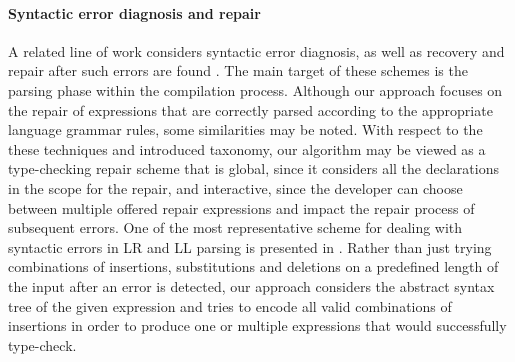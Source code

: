 \paragraph{{\bf Syntactic error diagnosis and repair}}
A related line of work considers syntactic error diagnosis, as well as recovery and repair
after such errors are found \cite{Hammond198451,Degano:1998:LTH:2245729.2245835}.
The main target of these schemes is the parsing phase within the compilation process. 
Although our approach focuses on the repair of expressions that are correctly parsed
according to the appropriate language grammar rules, some similarities may be noted.
With respect to the these techniques and introduced taxonomy, our algorithm may be viewed
as a type-checking repair scheme that is global, since it considers all the declarations
in the scope for the repair, and interactive, since the developer can choose between multiple
offered repair expressions and impact the repair process of subsequent errors. 
One of the most representative scheme for dealing with syntactic errors in LR and LL
parsing is presented in \cite{Burke87apractical}.
Rather than just trying combinations of insertions, substitutions and deletions
on a predefined length of the input after an error is detected, our approach
considers the abstract syntax tree of the given expression and tries to encode all valid combinations of insertions in order to produce one
or multiple expressions that would successfully type-check.

\vspace{-0.5em}
